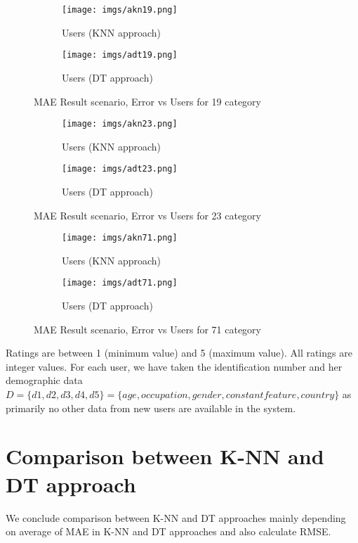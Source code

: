 \documentclass[document.tex]{subfiles}
\begin{document}
	
	\begin{figure}[H]
		\centering
		\begin{subfigure}[b]{0.49\textwidth}
			\texttt{[image: imgs/akn19.png]}
			\caption{Users (KNN approach)}
			\label{figkn19}
		\end{subfigure}
		\begin{subfigure}[b]{0.49\textwidth}
			\texttt{[image: imgs/adt19.png]}
			\caption{Users (DT approach)}
			\label{figdt19}
		\end{subfigure}
		\caption{MAE Result scenario,  Error vs Users for 19 category}\label{fig19}
	\end{figure}
\begin{figure}[H]
	\centering
	\begin{subfigure}[b]{0.49\textwidth}
		\texttt{[image: imgs/akn23.png]}
		\caption{Users (KNN approach)}
		\label{figkn23}
	\end{subfigure}
	\begin{subfigure}[b]{0.49\textwidth}
		\texttt{[image: imgs/adt23.png]}
		\caption{Users (DT approach)}
		\label{figdt23}
	\end{subfigure}
	\caption{MAE Result scenario,  Error vs Users for 23 category}\label{fig23}
\end{figure}

\begin{figure}[H]
	\centering
	\begin{subfigure}[b]{0.49\textwidth}
		\texttt{[image: imgs/akn71.png]}
		\caption{Users (KNN approach)}
		\label{figkn71}
	\end{subfigure}
	\begin{subfigure}[b]{0.49\textwidth}
		\texttt{[image: imgs/adt71.png]}
		\caption{Users (DT approach)}
		\label{figdt71}
	\end{subfigure}
	\caption{MAE Result scenario,  Error vs Users for 71 category}\label{fig71}
\end{figure}

Ratings are between 1 (minimum value) and 5 (maximum value). All ratings are integer values. For each user, we have taken the identification number and her demographic data $D = \{d1, d2, d3, d4, d5\} = \{age, occupation, gender, constant feature, country\}$ as primarily no other data from new users are available in the system.

\section{Comparison between K-NN and DT approach}
We conclude comparison between K-NN and DT approaches mainly depending on average of MAE in K-NN and DT approaches and also calculate RMSE.
\end{document}
